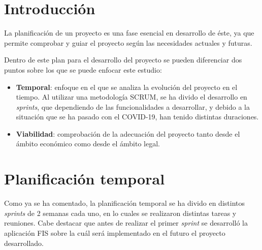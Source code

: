 
\section{Introducción}
La planificación de un proyecto es una fase esencial en desarrollo de éste, ya que permite comprobar y guiar el proyecto según las necesidades actuales y futuras.

Dentro de este plan para el desarrollo del proyecto se pueden diferenciar dos puntos sobre los que se puede enfocar este estudio:
\begin{itemize}
	\item \textbf{Temporal}: enfoque en el que se analiza la evolución del proyecto en el tiempo. Al utilizar una metodología SCRUM, se ha divido el desarrollo en \textit{sprints}, que dependiendo de las funcionalidades a desarrollar, y debido a la situación que se ha pasado con el COVID-19, han tenido distintas duraciones.
	\item \textbf{Viabilidad}: comprobación de la adecuación del proyecto tanto desde el ámbito económico como desde el ámbito legal.
\end{itemize}
\section{Planificación temporal}
Como ya se ha comentado, la planificación temporal se ha divido en distintos \textit{sprints} de 2 semanas cada uno, en lo cuales se realizaron distintas tareas y reuniones. Cabe destacar que antes de realizar el primer \textit{sprint} se desarrolló la aplicación FIS sobre la cuál será implementado en el futuro el proyecto desarrollado.

